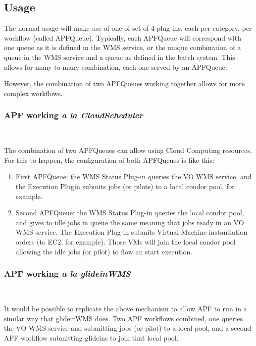 \documentclass[a4paper]{jpconf}
\begin{document}
\subsection{Usage}

The normal usage will make use of one of set of 4 plug-ins, each per category, per workflow (called APFQueue). 
Typically, each APFQueue will correspond with one queue as it is defined in the WMS service, 
or the unique combination of a queue in the WMS service and a queue as defined in the batch system. 
This allows for many-to-many combination, each one served by an APFQueue. 

However, the combination of two APFQueues working together allows for more complex workflows.

\subsubsection{APF working \emph{a la CloudScheduler}}

~

\noindent The combination of two APFQueues can allow using Cloud Computing resources. 
For this to happen, the configuration of both APFQueues is like this:

\begin{enumerate}
\item First APFQueue: 
the WMS Status Plug-in queries the VO WMS service, and the Execution Plugin submits jobs (or pilots) to a local condor pool, for example.
\item Second APFQueue: 
the WMS Status Plug-in queries the local condor pool, 
and gives to idle jobs in queue the same meaning that jobs ready in an VO WMS service. 
The Execution Plug-in submits Virtual Machine instantiation orders (to EC2, for example). 
Those VMs will join the local condor pool allowing the idle jobs (or pilot) to flow an start execution. 
\end{enumerate}

\subsubsection{APF working \emph{a la glideinWMS}}

~

\noindent It would be possible to replicate the above mechanism to allow APF to run in a similar way that glideinWMS does. 
Two APF workflows combined, one queries the VO WMS service and submitting jobs (or pilot) to a local pool, 
and a second APF workflow submitting glideins to join that local pool. 
\end{document}
